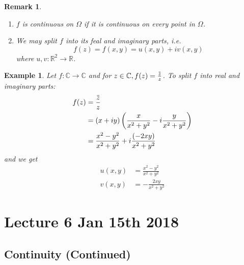 \documentclass[11pt, oneside]{book}
\theoremstyle{break}
\newtheorem*{remark}{Remark}
\newtheorem{eg}{Example}[section]
\renewcommand{\bar}[1]{\mkern 1.5mu \overline{\mkern -1.5mu #1 \mkern -1.5mu} \mkern 1.5mu}
\begin{document}
\begin{remark}
	\begin{enumerate}
		\item $f$ is continuous on $\Omega$ if it is continuous on every point in $\Omega$.
		\item We may split $f$ into its feal and imaginary parts, i.e.
			\begin{equation}\label{eq:complex function expressed in real-valued functions}
				f(z) = f(x, y) = u(x, y) + iv(x, y)
			\end{equation}
			where $u, v : \mathbb{R}^2 \to \mathbb{R}$.
	\end{enumerate}
\end{remark}

\begin{eg}
	Let $f: \mathbb{C} \to \mathbb{C}$ and for $z \in \mathbb{C}, f(z) = \frac{\bar{z}}{z}$. To split $f$ into real and imaginary parts:
	\begin{align*}
		f(z) &= \frac{\bar{z}}{z} \\
			&= (x + iy)\left(\frac{x}{x^2 + y^2} - i \frac{y}{x^2 + y^2} \right) \\
			&= \frac{x^2 - y^2}{x^2 + y^2} + i \frac{(-2xy)}{x^2 + y^2} 
	\end{align*}
	and we get
	\begin{align*}
		u(x, y) &= \frac{x^2 - y^2}{x^2 + y^2} \\
		v(x, y) &= -\frac{2xy}{x^2 + y^2} 
	\end{align*}
\end{eg}




\chapter{Lecture 6 Jan 15th 2018}
	\label{chapter:lecture_6_jan_15th_2018}

\section{Continuity (Continued)} %
\label{sec:continuity}
\end{document}

